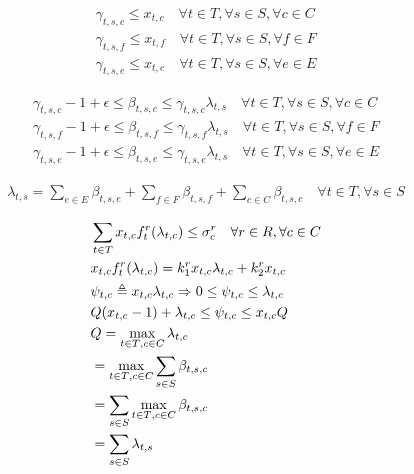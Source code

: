 \documentclass[conference]{IEEEtran}
\begin{document}
    \begin{subequations}
      \begin{align}
        \gamma_{t,s,c} \le x_{t,c} \quad \forall{t \in T}, \forall{s \in S}, \forall{c \in C} \\
        \gamma_{t,s,f} \le x_{t,f} \quad \forall{t \in T}, \forall{s \in S}, \forall{f \in F} \\
        \gamma_{t,s,e} \le x_{t,e} \quad \forall{t \in T}, \forall{s \in S}, \forall{e \in E}
      \end{align}
    \end{subequations}

    \begin{subequations}
      \begin{align}
          \gamma_{t,s,c}-1+\epsilon \le \beta_{t,s,c} \le \gamma_{t,s,c} \lambda_{t,s} \quad \forall{t \in T}, \forall{s \in S}, \forall{c \in C} \\
          \gamma_{t,s,f}-1+\epsilon \le \beta_{t,s,f} \le \gamma_{t,s,f} \lambda_{t,s} \quad \forall{t \in T}, \forall{s \in S}, \forall{f \in F} \\
          \gamma_{t,s,e}-1+\epsilon \le \beta_{t,s,e} \le \gamma_{t,s,e} \lambda_{t,s} \quad \forall{t \in T}, \forall{s \in S}, \forall{e \in E}
      \end{align}
    \end{subequations}

    \begin{subequations}
      \begin{align}
        \lambda_{t,s} = \sum_{e \in E} \beta_{t,s,e} + \sum_{f \in F} \beta_{t,s,f}
                        +\sum_{c \in C}\beta_{t,s,c} \quad \forall{t \in T}, \forall{s \in S}
      \end{align}
    \end{subequations}

    \begin{subequations}
      \begin{align}
        &\sum_{t \in T}x_{t,c}f_t^r(\lambda_{t,c}) \le \sigma_c^r \quad \forall{r \in R}, \forall{c \in C} \\
        &x_{t,c}f_t^r(\lambda_{t,c}) = k_1^rx_{t,c}\lambda_{t,c} + k_2^rx_{t,c} \\
        &\psi_{t,c} \triangleq x_{t,c}\lambda_{t,c} \Rightarrow 0 \leq \psi_{t,c} \leq \lambda_{t,c} \\
        &Q(x_{t,c}-1)+\lambda_{t,c} \leq \psi_{t,c} \leq x_{t,c}Q \\
        &\notag Q = \max_{{t \in T},{c \in C}} \lambda_{t,c} \\
        &\notag =\max_{{t \in T},{c \in C}} \sum_{s \in S}\beta_{t,s,c} \\
        &\notag =\sum_{s\in S} \max_{{t \in T},{c \in C}} \beta_{t,s,c} \\
        &=\sum_{s \in S}\lambda_{t,s}
      \end{align}
    \end{subequations}
\end{document}
